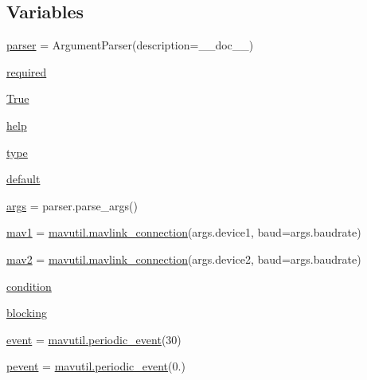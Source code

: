 \subsection*{Variables}
\begin{DoxyCompactItemize}
\item 
\mbox{\hyperlink{namespacepymavlink_1_1examples_1_1magtest_a783ce71ad67e0f1debb63c6d8779babb}{parser}} = Argument\+Parser(description=\+\_\+\+\_\+doc\+\_\+\+\_\+)
\item 
\mbox{\hyperlink{namespacepymavlink_1_1examples_1_1magtest_a5b41d82a28a2e1c5c0fb911678cab960}{required}}
\item 
\mbox{\hyperlink{namespacepymavlink_1_1examples_1_1magtest_a95dcb191104e324188f52da5a45cf367}{True}}
\item 
\mbox{\hyperlink{namespacepymavlink_1_1examples_1_1magtest_a37c7962cfe6f9c457707998e282ebb37}{help}}
\item 
\mbox{\hyperlink{namespacepymavlink_1_1examples_1_1magtest_a2233a45330480258997f60ba4baa5645}{type}}
\item 
\mbox{\hyperlink{namespacepymavlink_1_1examples_1_1magtest_ae658889b371954a05783abfb1df07ebd}{default}}
\item 
\mbox{\hyperlink{namespacepymavlink_1_1examples_1_1magtest_a3d082598042717821fce72281a19d9f0}{args}} = parser.\+parse\+\_\+args()
\item 
\mbox{\hyperlink{namespacepymavlink_1_1examples_1_1magtest_af56e58adebd478f91d306c5a095c9e4d}{mav1}} = \mbox{\hyperlink{namespacepymavlink_1_1mavutil_aa6c4b8861f86ef3bb746fa0fab241c93}{mavutil.\+mavlink\+\_\+connection}}(args.\+device1, baud=args.\+baudrate)
\item 
\mbox{\hyperlink{namespacepymavlink_1_1examples_1_1magtest_a3516235c2a928876739d7982bd9f5577}{mav2}} = \mbox{\hyperlink{namespacepymavlink_1_1mavutil_aa6c4b8861f86ef3bb746fa0fab241c93}{mavutil.\+mavlink\+\_\+connection}}(args.\+device2, baud=args.\+baudrate)
\item 
\mbox{\hyperlink{namespacepymavlink_1_1examples_1_1magtest_aca99d866c578887ca8b781563516bfc3}{condition}}
\item 
\mbox{\hyperlink{namespacepymavlink_1_1examples_1_1magtest_a7f38ead3d29b80bee730a85adc717add}{blocking}}
\item 
\mbox{\hyperlink{namespacepymavlink_1_1examples_1_1magtest_adea78a74209f350ecdcbc8517a7dd55c}{event}} = \mbox{\hyperlink{classpymavlink_1_1mavutil_1_1periodic__event}{mavutil.\+periodic\+\_\+event}}(30)
\item 
\mbox{\hyperlink{namespacepymavlink_1_1examples_1_1magtest_a8556daa189241634467717d1fc5477d0}{pevent}} = \mbox{\hyperlink{classpymavlink_1_1mavutil_1_1periodic__event}{mavutil.\+periodic\+\_\+event}}(0.)

\end{DoxyCompactItemize}

